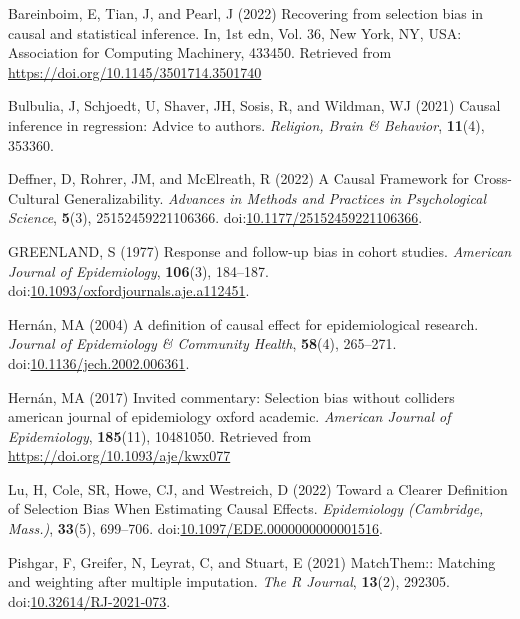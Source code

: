 \documentclass[
  singlecolumn,
  9pt]{article}
\newlength{\cslhangindent}
\newenvironment{CSLReferences}[2] %
 {\begin{list}{}{%
  \setlength{\itemindent}{0pt}
  \setlength{\leftmargin}{0pt}
  \setlength{\parsep}{0pt}
  \ifodd #1
   \setlength{\leftmargin}{\cslhangindent}
   \setlength{\itemindent}{-1\cslhangindent}
  \fi
  \setlength{\itemsep}{#2\baselineskip}}}
 {\end{list}}
\begin{document}
\label{refs}
\begin{CSLReferences}{1}{0}
Bareinboim, E, Tian, J, and Pearl, J (2022) Recovering from selection
bias in causal and statistical inference. In, 1st edn, Vol. 36, New
York, NY, USA: Association for Computing Machinery, 433450. Retrieved
from \url{https://doi.org/10.1145/3501714.3501740}

Bulbulia, J, Schjoedt, U, Shaver, JH, Sosis, R, and Wildman, WJ (2021)
Causal inference in regression: Advice to authors. \emph{Religion, Brain
\& Behavior}, \textbf{11}(4), 353360.

Deffner, D, Rohrer, JM, and McElreath, R (2022) A Causal Framework for
Cross-Cultural Generalizability. \emph{Advances in Methods and Practices
in Psychological Science}, \textbf{5}(3), 25152459221106366.
doi:\href{https://doi.org/10.1177/25152459221106366}{10.1177/25152459221106366}.

GREENLAND, S (1977) Response and follow-up bias in cohort studies.
\emph{American Journal of Epidemiology}, \textbf{106}(3), 184--187.
doi:\href{https://doi.org/10.1093/oxfordjournals.aje.a112451}{10.1093/oxfordjournals.aje.a112451}.

Hernán, MA (2004) A definition of causal effect for epidemiological
research. \emph{Journal of Epidemiology \& Community Health},
\textbf{58}(4), 265--271.
doi:\href{https://doi.org/10.1136/jech.2002.006361}{10.1136/jech.2002.006361}.

Hernán, MA (2017) Invited commentary: Selection bias without colliders
\textbar{} american journal of epidemiology \textbar{} oxford academic.
\emph{American Journal of Epidemiology}, \textbf{185}(11), 10481050.
Retrieved from \url{https://doi.org/10.1093/aje/kwx077}

Lu, H, Cole, SR, Howe, CJ, and Westreich, D (2022) Toward a Clearer
Definition of Selection Bias When Estimating Causal Effects.
\emph{Epidemiology (Cambridge, Mass.)}, \textbf{33}(5), 699--706.
doi:\href{https://doi.org/10.1097/EDE.0000000000001516}{10.1097/EDE.0000000000001516}.

Pishgar, F, Greifer, N, Leyrat, C, and Stuart, E (2021) MatchThem::
Matching and weighting after multiple imputation. \emph{The R Journal},
\textbf{13}(2), 292305.
doi:\href{https://doi.org/10.32614/RJ-2021-073}{10.32614/RJ-2021-073}.


\end{CSLReferences}
\end{document}
